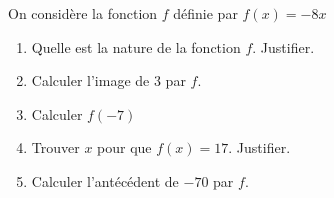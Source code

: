 \begin{minipage}{0.99\linewidth}

\exo


On considère la fonction $f$ définie par $f(x) = -8x$

\begin{enumerate}
\item Quelle est la nature de la fonction $f$. Justifier. 
\item Calculer l'image de $3$ par $f$.
\item Calculer $f(-7)$
\item Trouver $x$ pour que $f(x)= 17$. Justifier.
\item Calculer l'antécédent de $-70$ par $f$. 
\end{enumerate}

\end{minipage}

\vspace{0.5cm}
